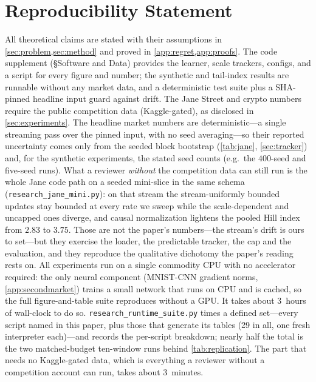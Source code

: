 \documentclass{article}
\begin{document}
\section*{Reproducibility Statement}
All theoretical claims are stated with their assumptions in \cref{sec:problem,sec:method} and
proved in \cref{app:regret,app:proofs}. The code supplement (\S Software and Data) provides the
learner, scale trackers, configs, and a script for every figure and number; the synthetic and
tail-index results are runnable without any market data, and a deterministic test suite plus a
SHA-pinned headline input guard against drift. The Jane Street and crypto numbers require the
public competition data (Kaggle-gated), as disclosed in \cref{sec:experiments}. The headline
market numbers are deterministic---a single streaming pass over the pinned input, with no
seed averaging---so their reported uncertainty comes only from the seeded block bootstrap
(\cref{tab:jane}, \cref{sec:tracker}) and, for the synthetic experiments, the stated seed
counts (e.g.\ the $400$-seed and five-seed runs).
What a reviewer \emph{without} the competition data can still run is the whole Jane code path
on a seeded mini-slice in the same schema (\texttt{research\_jane\_mini.py}): on that stream
the stream-uniformly bounded updates stay bounded at every rate we sweep while the scale-dependent
and uncapped ones diverge, and causal normalization lightens the pooled Hill index from
$2.83$ to $3.75$. Those are not the paper's numbers---the stream's drift is ours to set---but
they exercise the loader, the predictable tracker, the cap and the evaluation, and they
reproduce the qualitative dichotomy the paper's reading rests on. All experiments run on a single commodity
CPU with no accelerator required: the only neural component (MNIST-CNN gradient norms,
\cref{app:secondmarket}) trains a small network that runs on CPU and is cached, so the full
figure-and-table suite reproduces without a GPU. It takes about 3~hours of wall-clock to do
so. \texttt{research\_runtime\_suite.py} times a defined set---every script named in this
paper, plus those that generate its tables (29 in all, one fresh interpreter each)---and
records the per-script breakdown; nearly half the total is the two matched-budget ten-window
runs behind \cref{tab:replication}. The part that needs no Kaggle-gated data, which is
everything a reviewer without a competition account can run, takes about 3~minutes.
\end{document}
